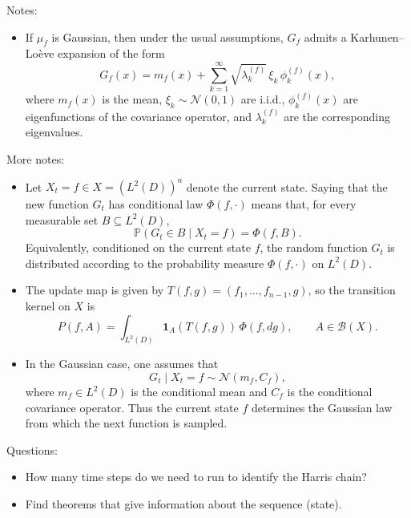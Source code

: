 \documentclass{article}
\begin{document}
Notes:
\begin{itemize}
    \item If $\mu_f$ is Gaussian, then under the usual assumptions, $G_f$ admits a Karhunen--Lo\`eve expansion of the form
    \begin{equation*}
        G_f(x) = m_f(x) + \sum_{k=1}^\infty \sqrt{\lambda_k^{(f)}}\,\xi_k\,\phi_k^{(f)}(x),
    \end{equation*}
    where $m_f(x)$ is the mean, $\xi_k \sim \mathcal{N}(0,1)$ are i.i.d., $\phi_k^{(f)}(x)$ are eigenfunctions of the covariance operator, and $\lambda_k^{(f)}$ are the corresponding eigenvalues.
\end{itemize}
More notes:
\begin{itemize}
    \item Let $X_t = f \in X = (L^2(D))^n$ denote the current state. Saying that the new function $G_t$ has conditional law $\Phi(f,\cdot)$ means that, for every measurable set $B \subseteq L^2(D)$,
    \[
    \mathbb{P}(G_t \in B \mid X_t = f) = \Phi(f,B).
    \]
    Equivalently, conditioned on the current state $f$, the random function $G_t$ is distributed according to the probability measure $\Phi(f,\cdot)$ on $L^2(D)$.

    \item The update map is given by $T(f,g) = (f_1,\dots,f_{n-1},g)$, so the transition kernel on $X$ is
    \[
    P(f,A) = \int_{L^2(D)} \mathbf{1}_A(T(f,g))\,\Phi(f,dg),
    \qquad A \in \mathcal{B}(X).
    \]

    \item In the Gaussian case, one assumes that
    \[
    G_t \mid X_t = f \sim \mathcal{N}(m_f, C_f),
    \]
    where $m_f \in L^2(D)$ is the conditional mean and $C_f$ is the conditional covariance operator. Thus the current state $f$ determines the Gaussian law from which the next function is sampled.


\end{itemize}
Questions:
\begin{itemize}
    \item How many time steps do we need to run to identify the Harris chain?
    \item Find theorems that give information about the sequence (state).
\end{itemize}
\end{document}
